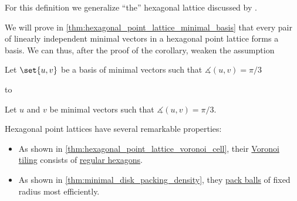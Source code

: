 \begin{comments}
  \item For this definition we generalize \enquote{the} hexagonal lattice discussed by .

  \item We will prove in \cref{thm:hexagonal_point_lattice_minimal_basis} that every pair of linearly independent minimal vectors in a hexagonal point lattice forms a basis. We can thus, after the proof of the corollary, weaken the assumption
  \begin{displayquote}
    Let \( \set{ u, v } \) be a basis of minimal vectors such that \( \measuredangle(u, v) = \pi / 3 \)
  \end{displayquote}
  to
  \begin{displayquote}
    Let \( u \) and \( v \) be minimal vectors such that \( \measuredangle(u, v) = \pi / 3 \).
  \end{displayquote}

  \item Hexagonal point lattices have several remarkable properties:
  \begin{itemize}
    \item As shown in \cref{thm:hexagonal_point_lattice_voronoi_cell}, their \hyperref[def:voronoi_tiling]{Voronoi tiling} consists of \hyperref[def:regular_polygon]{regular hexagons}.
    \item As shown in \cref{thm:minimal_disk_packing_density}, they \hyperref[def:lattice_ball_packing]{pack balls} of fixed radius most efficiently.
  \end{itemize}
\end{comments}

